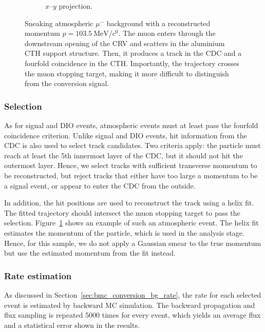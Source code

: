\begin{figure}
\begin{subfigure}{0.43\textwidth}
        \caption{$x$--$y$ projection.}
    \end{subfigure}
    \caption{ Sneaking atmospheric $\mu^-$ background with a reconstructed
        momentum $p=\SI{103.5}{\MeV/\clight}$. The muon enters through the
        downstream opening of the CRV and scatters in the aluminium CTH support
        structure. Then, it produces a track in the CDC and a fourfold
        coincidence in the CTH. Importantly, the trajectory crosses the muon
        stopping target, making it more difficult to distinguish from the
        conversion signal. }
    \label{fig:cosmic_muon_bg_in_cydet}
\end{figure}

\subsubsection{Selection}
As for signal and DIO events, atmospheric events must at least pass the fourfold
coincidence criterion. Unlike signal and DIO events, hit information from the
CDC is also used to select track candidates. Two criteria apply: the particle
must reach at least the 5th innermost layer of the CDC, but it should not hit
the outermost layer. Hence, we select tracks with sufficient transverse
momentum to be reconstructed, but reject tracks that either have too large a
momentum to be a signal event, or appear to enter the CDC from the outside. 

In addition, the hit positions are used to reconstruct the track using a helix
fit. The fitted trajectory should intersect the muon stopping target to pass the
selection. Figure~\ref{fig:cosmic_muon_bg_in_cydet} shows an example of such an
atmospheric event. The helix fit estimates the momentum of the particle, which
is used in the analysis stage. Hence, for this sample, we do not apply a
Gaussian smear to the true momentum but use the estimated momentum from the fit
instead.

\subsubsection{Rate estimation}
As discussed in Section~\ref{sec:bmc_conversion_bg_rate}, the rate for each selected
event is estimated by backward MC simulation. The backward propagation and flux
sampling is repeated 5000 times for every event, which yields an average flux
and a statistical error shown in the results.


